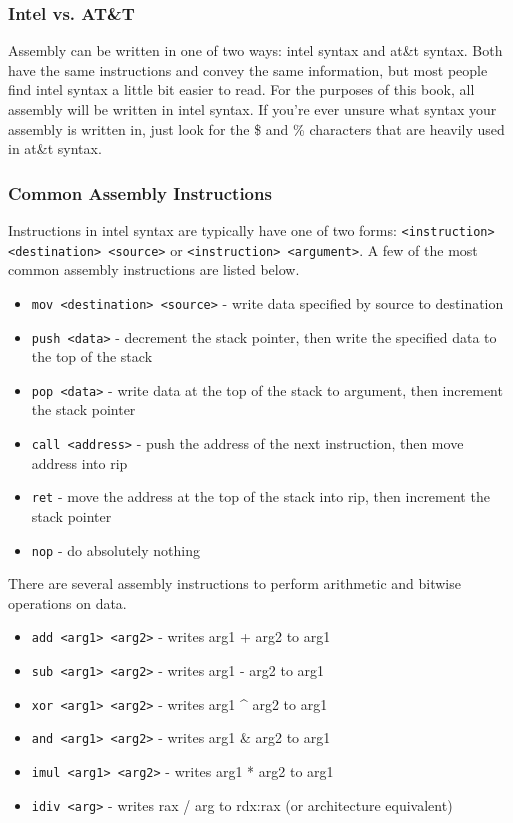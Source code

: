 \subsubsection{Intel vs. AT\&T}
Assembly can be written in one of two ways: intel syntax and at\&t syntax. Both
have the same instructions and convey the same information, but most people find
intel syntax a little bit easier to read. For the purposes of this book, all
assembly will be written in intel syntax. If you're ever unsure what syntax your
assembly is written in, just look for the \$ and \% characters that are heavily
used in at\&t syntax.

\subsubsection{Common Assembly Instructions}
Instructions in intel syntax are typically have one of two forms:
\texttt{<instruction> <destination> <source>} or \texttt{<instruction>
<argument>}. A few of the most common assembly instructions are listed below.

\begin{itemize}
    \item \texttt{mov <destination> <source>} - write data specified by source
        to destination
    \item \texttt{push <data>} - decrement the stack pointer, then write the
        specified data to the top of the stack
    \item \texttt{pop <data>} - write data at the top of the stack to argument,
        then increment the stack pointer
    \item \texttt{call <address>} - push the address of the next instruction,
        then move address into rip
    \item \texttt{ret} - move the address at the top of the stack into rip,
        then increment the stack pointer
    \item \texttt{nop} - do absolutely nothing
\end{itemize}

There are several assembly instructions to perform arithmetic and bitwise
operations on data.

\begin{itemize}
    \item \texttt{add <arg1> <arg2>} - writes arg1 + arg2 to arg1
    \item \texttt{sub <arg1> <arg2>} - writes arg1 - arg2 to arg1
    \item \texttt{xor <arg1> <arg2>} - writes arg1 ^ arg2 to arg1
    \item \texttt{and <arg1> <arg2>} - writes arg1 & arg2 to arg1
    \item \texttt{imul <arg1> <arg2>} - writes arg1 * arg2 to arg1
    \item \texttt{idiv <arg>} - writes rax / arg to rdx:rax (or architecture
        equivalent)
\end{itemize}

